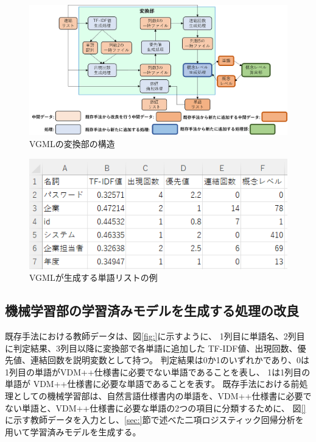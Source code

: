 \begin{figure}[t]
    \begin{center}
        \includegraphics[width=1.0\columnwidth]{image/vgml_transfer.png}
        \caption{VGMLの変換部の構造}
        \label{fig:vgml_transfer}
    \end{center}
\end{figure}

\begin{figure}[t]
    \begin{center}
        \includegraphics[width=1.0\columnwidth]{image/vgml_word_list.png}
        \caption{VGMLが生成する単語リストの例}
        \label{fig:vgml_word_list}
    \end{center}
\end{figure}

\subsection{機械学習部の学習済みモデルを生成する処理の改良}
\label{sec:vgml_train_model}
既存手法における教師データは、図\ref{fig:}に示すように、
1列目に単語名、2列目に判定結果、3列目以降に変換部で各単語に追加した TF-IDF値、出現回数、優先値、連結回数を説明変数として持つ。
判定結果は0か1のいずれかであり、0は1列目の単語がVDM++仕様書に必要でない単語であることを表し、
1は1列目の単語が VDM++仕様書に必要な単語であることを表す。
既存手法における前処理としての機械学習部は、自然言語仕様書内の単語を、VDM++仕様書に必要でない単語と、VDM++仕様書に必要な単語の2つの項目に分類するために、
図\ref{}に示す教師データを入力とし、\ref{sec:}節で述べた二項ロジスティック回帰分析を用いて学習済みモデルを生成する。


